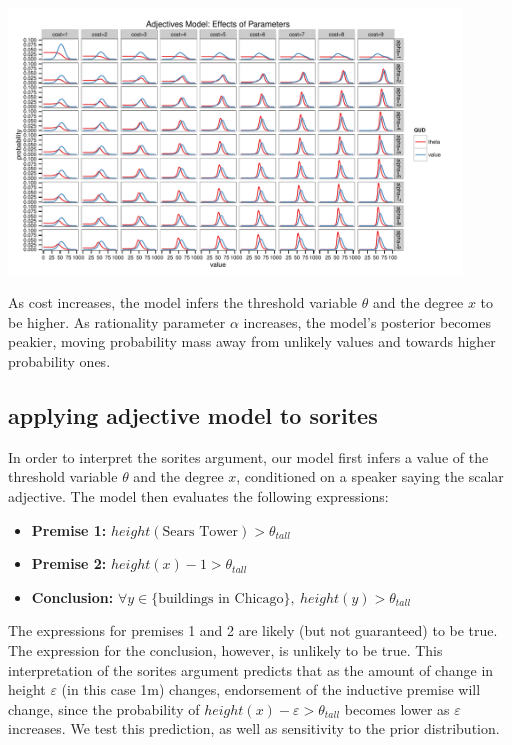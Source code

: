 \documentclass[10pt]{article}
\begin{document}
    \includegraphics[width=0.9\textwidth]{toy_parameter_search.pdf}
    
    As cost increases, the model infers the threshold variable $\theta$ and the degree $x$ to be higher. As rationality parameter $\alpha$ increases, the model's posterior becomes peakier, moving probability mass away from unlikely values and towards higher probability ones.
    
%     
    
  \subsection{applying adjective model to sorites}
    In order to interpret the sorites argument, our model first infers a value of the threshold variable $\theta$ and the degree $x$, conditioned on a speaker saying the scalar adjective. The model then evaluates the following expressions:
        
    \begin{itemize}
    \item[] \textbf{Premise 1:} $height(\mbox{Sears Tower}) > \theta_{tall}$
    \item[] \textbf{Premise 2:} $height(x) - 1 > \theta_{tall}$
    \item[] \textbf{Conclusion:} $\forall y \in \{ \mbox{buildings in Chicago} \}, \ height(y) > \theta_{tall}$
    \end{itemize}
    
    The expressions for premises 1 and 2 are likely (but not guaranteed) to be true. The expression for the conclusion, however, is unlikely to be true. This interpretation of the sorites argument predicts that as the amount of change in height $\varepsilon$ (in this case 1m) changes, endorsement of the inductive premise will change, since the probability of $height(x) - \varepsilon > \theta_{tall}$ becomes lower as $\varepsilon$ increases. We test this prediction, as well as sensitivity to the prior distribution.
    
\end{document}
